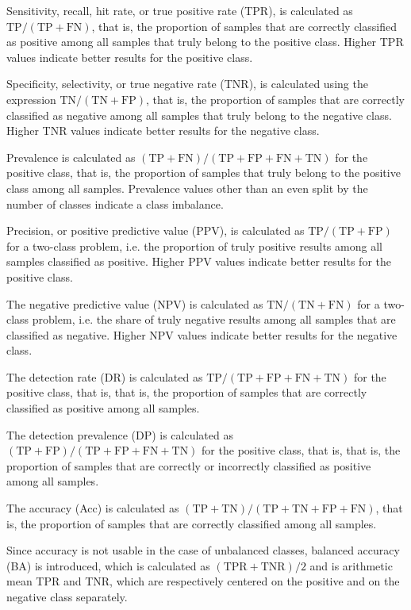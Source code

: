 \documentclass[sn-mathphys-num]{sn-jnl}%
\begin{document}
Sensitivity, recall, hit rate, or true positive rate (TPR), is calculated as $\mathrm{TP}/(\mathrm{TP}+\mathrm{FN})$, that is, the proportion of samples that are correctly classified as positive among all samples that truly belong to the positive class. Higher TPR values indicate better results for the positive class.

Specificity, selectivity, or true negative rate (TNR), is calculated using the expression $\mathrm{TN}/(\mathrm{TN}+\mathrm{FP})$, that is, the proportion of samples that are correctly classified as negative among all samples that truly belong to the negative class. Higher TNR values indicate better results for the negative class.

Prevalence is calculated as $(\mathrm{TP}+\mathrm{FN})/(\mathrm{TP}+\mathrm{FP}+\mathrm{FN}+\mathrm{TN})$ for the positive class, that is, the proportion of samples that truly belong to the positive class among all samples. Prevalence values other than an even split by the number of classes indicate a class imbalance.

Precision, or positive predictive value (PPV), is calculated as $\mathrm{TP}/(\mathrm{TP}+\mathrm{FP})$ for a two-class problem, i.e. the proportion of truly positive results among all samples classified as positive. 
Higher PPV values indicate better results for the positive class.

The negative predictive value (NPV) is calculated as $\mathrm{TN}/(\mathrm{TN}+\mathrm{FN})$ for a two-class problem, i.e. the share of truly negative results among all samples that are classified as negative. Higher NPV values indicate better results for the negative class.

The detection rate (DR) is calculated as $\mathrm{TP}/(\mathrm{TP}+\mathrm{FP}+\mathrm{FN}+\mathrm{TN})$ for the positive class, that is, that is, the proportion of samples that are correctly classified as positive among all samples.

The detection prevalence (DP) is calculated as $(\mathrm{TP}+\mathrm{FP})/(\mathrm{TP}+\mathrm{FP}+\mathrm{FN}+\mathrm{TN})$ for the positive class, that is, that is, the proportion of samples that are correctly or incorrectly classified as positive among all samples.

The accuracy (Acc) is calculated as $(\mathrm{TP} + \mathrm{TN}) / (\mathrm{TP} + \mathrm{TN} + \mathrm{FP} + \mathrm{FN})$, that is, the proportion of samples that are correctly classified among all samples.

Since accuracy is not usable in the case of unbalanced classes, balanced accuracy (BA) is introduced, which is calculated as $(\mathrm{TPR} + \mathrm{TNR}) / 2$ and is arithmetic mean TPR and TNR, which are respectively centered on the positive and on the negative class separately.
\end{document}

